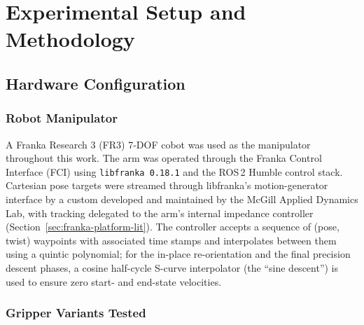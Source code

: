 \chapter{\rm\bfseries Experimental Setup and Methodology}
\label{ch:methods}

\section{Hardware Configuration}

\subsection{Robot Manipulator}

A Franka Research 3 (FR3) 7-DOF cobot was used as the manipulator
throughout this work. The arm was operated through the Franka Control Interface (FCI)
using \texttt{libfranka 0.18.1} and the ROS\,2 Humble control stack.
Cartesian pose targets were streamed through libfranka's motion-generator
interface by a custom  developed and
maintained by the McGill Applied Dynamics Lab, with tracking delegated to
the arm's internal impedance controller
(Section~\ref{sec:franka-platform-lit}). The
controller accepts a sequence of (pose, twist) waypoints with associated
time stamps and interpolates between them using a quintic polynomial;
for the in-place re-orientation and the final precision descent phases,
a cosine half-cycle S-curve interpolator (the ``sine descent'') is used
to ensure zero start- and end-state velocities.

\subsection{Gripper Variants Tested}
\label{sec:variants}

